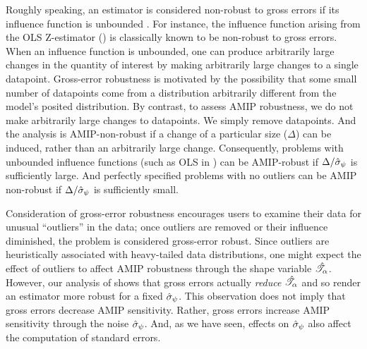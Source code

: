 %
Roughly speaking, an estimator is considered non-robust to gross errors if its
influence function is unbounded \citep{huber1981robust}.  For instance, the
influence function arising from the OLS Z-estimator
() is classically known to be non-robust to gross
errors. When an influence function is unbounded, one can produce arbitrarily
large changes in the quantity of interest by making arbitrarily large changes to
a single datapoint.  Gross-error robustness is motivated by the possibility that
some small number of datapoints come from a distribution arbitrarily different
from the model's posited distribution. By contrast, to assess AMIP robustness,
we do not make arbitrarily large changes to datapoints. We simply remove
datapoints. And the analysis is AMIP-non-robust if a change of a particular size
($\Delta$) can be induced, rather than an arbitrarily large change.
Consequently, problems with unbounded influence functions (such as OLS in
) can be AMIP-robust if $\Delta / \hat{\sigma}_{\psi}$ is
sufficiently large. And perfectly specified problems with no outliers can be
AMIP non-robust if $\Delta / \hat{\sigma}_{\psi}$ is sufficiently small.


%
Consideration of gross-error robustness encourages users to examine their data
for unusual ``outliers'' in the data; once outliers are removed or their
influence diminished, the problem is considered gross-error robust.  Since
outliers are heuristically associated with heavy-tailed data distributions, one
might expect the effect of outliers to affect AMIP robustness through the shape
variable $\hat{\mathscr{T}}_\alpha$.  However, our analysis of
 shows that gross errors actually {\em
reduce} $\hat{\mathscr{T}}_\alpha$ and so render an estimator more robust for a fixed
$\hat{\sigma}_{\psi}$. This observation does not imply that gross errors decrease AMIP
sensitivity.  Rather, gross errors increase AMIP sensitivity through the noise
$\hat{\sigma}_{\psi}$. And, as we have seen, effects on $\hat{\sigma}_{\psi}$ also affect the
computation of standard errors.

